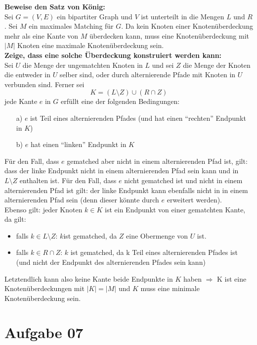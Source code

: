 \documentclass[10pt,a4paper]{article}
\begin{document}
    \textbf{Beweise den Satz von König:} \\
    Sei $G = (V,E)$ ein bipartiter Graph und $V$ ist unterteilt in
    die Mengen $L$ und $R$. Sei $M$ ein maximales Matching für $G$.
    Da kein Knoten einer Knotenüberdeckung mehr als eine Kante von $M$
    überdecken kann, muss eine Knotenüberdeckung mit $|M|$ Knoten eine
    maximale Knotenüberdeckung sein.
    \\
    \textbf{Zeige, dass eine solche Überdeckung konstruiert werden kann:}
    \\
    Sei $U$ die Menge der ungematchten Knoten in $L$ und sei $Z$ die Menge
    der Knoten die entweder in $U$ selber sind, oder durch alternierende Pfade mit
    Knoten in $U$ verbunden sind. Ferner sei
    $$
        K = (L\setminus Z) \cup (R\cap Z)
    $$
    jede Kante $e$ in $G$ erfüllt eine der folgenden Bedingungen:
    \begin{itemize}
        \item[a)] $e$ ist Teil eines alternierenden Pfades (und hat einen ``rechten''
        Endpunkt in $K$)
        \item[b)] $e$ hat einen ``linken'' Endpunkt in $K$
    \end{itemize}
    Für den Fall, dass $e$ gematched aber nicht in einem alternierenden Pfad ist, gilt:
    dass der linke Endpunkt nicht in einem alternierenden Pfad sein kann und in $L\setminus Z$
    enthalten ist. Für den Fall, dass $e$ nicht gematched ist und nicht in
    einem alternierenden Pfad ist gilt: der linke Endpunkt  kann ebenfalls nicht in
    in einem alternierenden Pfad sein (denn dieser könnte durch $e$ erweitert werden).
   \\
   Ebenso gilt: jeder Knoten $k \in K$ ist ein Endpunkt von einer gematchten
   Kante, da gilt:
   \begin{itemize}
        \item  falls $k \in L\setminus Z $: $k $ist gematched, da $Z$ eine Obermenge von $U$ ist.
        \item falls $k \in R\cap Z$: $k$ ist gematched, da k Teil eines alternierenden
            Pfades ist (und  nicht der Endpunkt des alternierenden Pfades sein kann)

   \end{itemize}
    Letztendlich kann also keine Kante beide Endpunkte in $K$ haben
    $\Rightarrow$ K ist eine Knotenüberdeckungen mit $|K| = |M|$ und $K$ muss
    eine minimale Knotenüberdeckung sein.

\section*{Aufgabe 07}
\end{document}
